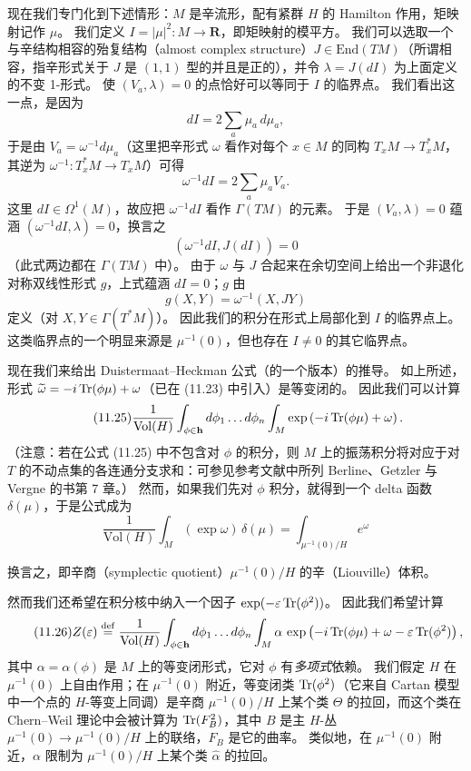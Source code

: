 现在我们专门化到下述情形：$M$ 是辛流形，配有紧群 $H$ 的 Hamilton 作用，矩映射记作 $\mu$。
我们定义 $I=|\mu|^{2}:M\to\mathbf{R}$，即矩映射的模平方。
我们可以选取一个与辛结构相容的殆复结构（almost complex structure）$J\in\mathrm{End}(TM)$（所谓相容，指辛形式关于 $J$ 是 $(1,1)$ 型的并且是正的），并令 $\lambda=J(dI)$ 为上面定义的不变 1-形式。
使 $(V_{a},\lambda)=0$ 的点恰好可以等同于 $I$ 的临界点。
我们看出这一点，是因为
\[
dI=2\sum_{a}\mu_{a}\,d\mu_{a},
\]
于是由 $V_{a}=\omega^{-1}d\mu_{a}$（这里把辛形式 $\omega$ 看作对每个 $x\in M$ 的同构 $T_{x}M\to T^{*}_{x}M$，其逆为 $\omega^{-1}:T^{*}_{x}M\to T_{x}M$）可得
\[
\omega^{-1}dI=2\sum_{a}\mu_{a}V_{a}.
\]
这里 $dI\in\Omega^{1}(M)$，故应把 $\omega^{-1}dI$ 看作 $\Gamma(TM)$ 的元素。
于是 $(V_{a},\lambda)=0$ 蕴涵 $(\omega^{-1}dI,\lambda)=0$，换言之
\[
(\omega^{-1}dI,J(dI))=0
\]
（此式两边都在 $\Gamma(TM)$ 中）。
由于 $\omega$ 与 $J$ 合起来在余切空间上给出一个非退化对称双线性形式 $g$，上式蕴涵 $dI=0$；$g$ 由
\[
g(X,Y)=\omega^{-1}(X,JY)
\]
定义（对 $X,Y\in\Gamma(T^{*}M)$）。
因此我们的积分在形式上局部化到 $I$ 的临界点上。
这类临界点的一个明显来源是 $\mu^{-1}(0)$，但也存在 $I\neq0$ 的其它临界点。

现在我们来给出 Duistermaat–Heckman 公式（的一个版本）的推导。
如上所述，形式 $\widetilde\omega=-i\operatorname{Tr}(\phi\mu)+\omega$（已在 (11.23) 中引入）是等变闭的。
因此我们可以计算
\begin{equation}
  \tag{11.25}
  \label{eq:11-25}
  \frac{1}{\mathrm{Vol}(H)}\int_{\phi\in\mathbf{h}}d\phi_{1}\dots d\phi_{n}\int_{M}
  \exp\left(-i\operatorname{Tr}(\phi\mu)+\omega\right).
\end{equation}
（注意：若在公式 (11.25) 中不包含对 $\phi$ 的积分，则 $M$ 上的振荡积分将对应于对 $T$ 的不动点集的各连通分支求和：可参见参考文献中所列 Berline、Getzler 与 Vergne 的书第 7 章。）
然而，如果我们先对 $\phi$ 积分，就得到一个 delta 函数 $\delta(\mu)$，于是公式成为
\[
\frac{1}{\mathrm{Vol}(H)}\int_{M}(\exp\omega)\,\delta(\mu)=\int_{\mu^{-1}(0)/H}e^{\omega}
\]

换言之，即辛商（symplectic quotient）$\mu^{-1}(0)/H$ 的辛（Liouville）体积。

然而我们还希望在积分核中纳入一个因子 $\exp(-\varepsilon\operatorname{Tr}(\phi^{2}))$。
因此我们希望计算
\begin{equation}
  \tag{11.26}
  \label{eq:11-26}
  Z(\varepsilon)\overset{\mathrm{def}}{=}\frac{1}{\mathrm{Vol}(H)}
  \int_{\phi\in\mathbf{h}}d\phi_{1}\dots d\phi_{n}\int_{M}\alpha\,
  \exp\left(-i\operatorname{Tr}(\phi\mu)+\omega-\varepsilon\operatorname{Tr}(\phi^{2})\right),
\end{equation}
其中 $\alpha=\alpha(\phi)$ 是 $M$ 上的等变闭形式，它对 $\phi$ 有\emph{多项式}依赖。
我们假定 $H$ 在 $\mu^{-1}(0)$ 上自由作用；在 $\mu^{-1}(0)$ 附近，等变闭类 $\operatorname{Tr}(\phi^{2})$（它来自 Cartan 模型中一个点的 $H$-等变上同调）是辛商 $\mu^{-1}(0)/H$ 上某个类 $\Theta$ 的拉回，而这个类在 Chern–Weil 理论中会被计算为 $\operatorname{Tr}(F_{B}^{2})$，其中 $B$ 是主 $H$-丛 $\mu^{-1}(0)\to\mu^{-1}(0)/H$ 上的联络，$F_{B}$ 是它的曲率。
类似地，在 $\mu^{-1}(0)$ 附近，$\alpha$ 限制为 $\mu^{-1}(0)/H$ 上某个类 $\widehat\alpha$ 的拉回。

